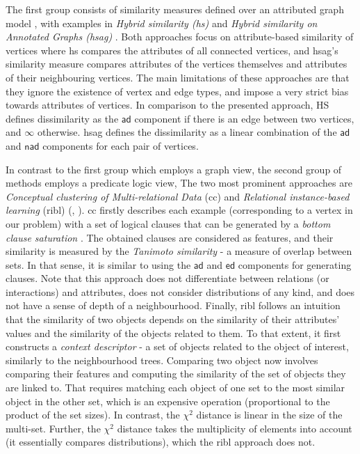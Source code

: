 The first group consists of similarity measures defined over an attributed graph model \cite{Pfeiffer2014}, with examples in  \textit{Hybrid similarity (\gls{hs})} \cite{Neville03clusteringrelational} and \textit{Hybrid similarity on Annotated Graphs (\gls{hsag})} \cite{WitsenburgB11a}.
Both approaches focus on attribute-based similarity of vertices where \gls{hs} compares the attributes of all connected vertices, and \gls{hsag}'s similarity measure compares attributes of the vertices themselves and attributes of their neighbouring vertices.
The main limitations of these approaches are that they ignore the existence of vertex and edge types, and impose a very strict bias towards attributes of vertices.
In comparison to the presented approach, HS defines dissimilarity as the $\mathsf{ad}$ component if there is an edge between two vertices, and $\infty$ otherwise.
\gls{hsag} defines the dissimilarity as a linear combination of the $\mathsf{ad}$ and $\mathsf{nad}$ components for each pair of vertices.



In contrast to the first group which employs a graph view, the second group of methods employs a predicate logic view,
The two most prominent approaches are \textit{Conceptual clustering of Multi-relational Data} (\gls{cc}) \cite{Fonseca2012} and \textit{Relational instance-based learning} (\gls{ribl}) (\cite{RIBL96}, \cite{Kirsten98relationaldistance-based}).
\gls{cc} firstly describes each example (corresponding to a vertex in our problem) with a set of logical clauses that can be generated by a \textit{bottom clause saturation} \cite{CamachoFRC07}.
The obtained clauses are considered as features, and their similarity is measured by  the \textit{Tanimoto similarity} - a measure of overlap between sets.
In that sense, it is similar to using the $\mathsf{ad}$ and $\mathsf{ed}$ components for generating clauses.
Note that this approach does not differentiate between relations (or interactions) and attributes, does not consider distributions of any kind, and does not have a sense of depth of a neighbourhood.
Finally, \gls{ribl} follows an intuition that the similarity  of two objects depends on the similarity of their attributes' values and the similarity of the objects related to them.
To that extent, it first constructs a \textit{context descriptor} - a set of objects related to the object of interest, similarly to the neighbourhood trees.
Comparing two object now involves comparing their features and computing the similarity of the set of objects they are linked to.
That requires matching each object of one set to the most similar object in the other set, which is an expensive operation (proportional to the product of the set sizes).
In contrast, the $\chi^2$ distance is linear in the size of the multi-set.
Further, the $\chi^2$ distance takes the multiplicity of elements into account (it essentially compares distributions), which the \gls{ribl} approach does not.


